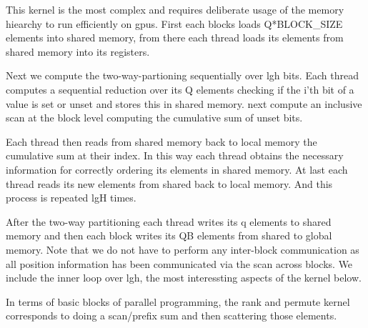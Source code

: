 \documentclass{article}
\begin{document}
This kernel is the most complex and requires deliberate usage of the memory hiearchy to run efficiently on gpus.
First each blocks loads Q*BLOCK\_SIZE elements into shared memory, from there each thread loads its elements from shared memory into its registers.

Next we compute the two-way-partioning sequentially over lgh bits. 
Each thread computes a sequential reduction over its Q elements checking if the i'th bit of a value is set or unset and stores this in shared memory. 
next compute an inclusive scan at the block level computing the cumulative sum of unset bits. 

Each thread then reads from shared memory back to local memory the cumulative sum at their index. 
In this way each thread obtains the necessary information for correctly ordering its elements in shared memory. 
At last each thread reads its new elements from shared back to local memory. And this process is repeated lgH times.

After the two-way partitioning each thread writes its q elements to shared memory and then each block writes its QB elements from shared to global memory. 
Note that we do not have to perform any inter-block communication as all position information has been communicated via the scan across blocks.
We include the inner loop over lgh, the most interessting aspects of the kernel below.

In terms of basic blocks of parallel programming, the rank and permute kernel corresponds to doing a scan/prefix sum and then scattering those elements. 
\newpage
\end{document}
